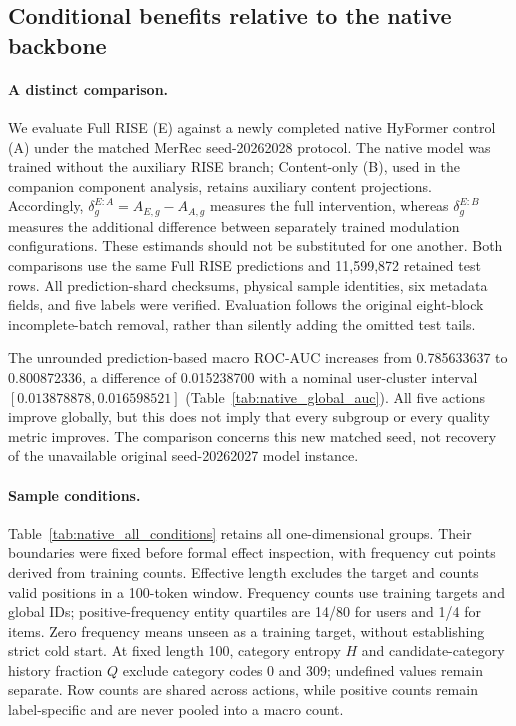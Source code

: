 \subsection{Conditional benefits relative to the native backbone}
\label{sec:rise_native_merrec_conditions}

\paragraph{A distinct comparison.}
We evaluate Full RISE (E) against a newly completed native HyFormer control (A)
under the matched MerRec seed-20262028 protocol. The native model was trained
without the auxiliary RISE branch; Content-only (B), used in the companion
component analysis, retains auxiliary content projections. Accordingly,
$\delta_g^{E:A}=A_{E,g}-A_{A,g}$ measures the full intervention, whereas
$\delta_g^{E:B}$ measures the additional difference between separately trained
modulation configurations. These estimands should not be substituted for one
another. Both comparisons use the same Full RISE predictions and 11,599,872
retained test rows. All prediction-shard checksums, physical sample identities,
six metadata fields, and five labels were verified. Evaluation follows the
original eight-block incomplete-batch removal, rather than silently adding
the omitted test tails.

The unrounded prediction-based macro ROC-AUC increases from 0.785633637 to
0.800872336, a difference of 0.015238700 with a nominal user-cluster interval
$[0.013878878,0.016598521]$ (Table~\ref{tab:native_global_auc}). All five actions
improve globally, but this does not imply that every subgroup or every quality
metric improves. The comparison concerns this new matched seed, not recovery
of the unavailable original seed-20262027 model instance.

\paragraph{Sample conditions.}
Table~\ref{tab:native_all_conditions} retains all one-dimensional groups.
Their boundaries were fixed before formal effect inspection, with frequency
cut points derived from training counts. Effective length excludes the target
and counts valid positions in a
100-token window. Frequency counts use training targets and global IDs;
positive-frequency entity quartiles are 14/80 for users and 1/4 for items.
Zero frequency means unseen as a training target, without establishing strict
cold start. At fixed length 100, category entropy $H$ and candidate-category
history fraction $Q$ exclude category codes 0 and 309; undefined values remain
separate. Row counts are shared across actions, while positive counts remain
label-specific and are never pooled into a macro count.


